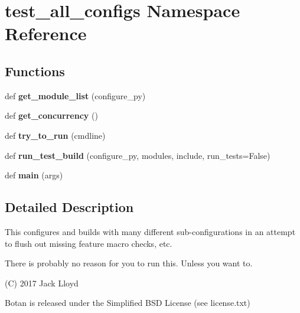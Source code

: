 \hypertarget{namespacetest__all__configs}{}\section{test\+\_\+all\+\_\+configs Namespace Reference}
\label{namespacetest__all__configs}
\subsection*{Functions}
\begin{DoxyCompactItemize}
\item 
\mbox{\label{namespacetest__all__configs_adf186082a5497497bf7870fa29511d61}} 
def {\bfseries get\+\_\+module\+\_\+list} (configure\+\_\+py)
\item 
\mbox{\label{namespacetest__all__configs_a820b2661dd95b2d159611db3129de91b}} 
def {\bfseries get\+\_\+concurrency} ()
\item 
\mbox{\label{namespacetest__all__configs_a41b734f98f45721f8a72a99e3dc6ea23}} 
def {\bfseries try\+\_\+to\+\_\+run} (cmdline)
\item 
\mbox{\label{namespacetest__all__configs_a64e1a68c48d377aee71399a4061ae38e}} 
def {\bfseries run\+\_\+test\+\_\+build} (configure\+\_\+py, modules, include, run\+\_\+tests=False)
\item 
\mbox{\label{namespacetest__all__configs_a7b10c21e5b6c55b22b0e17163b57d7e8}} 
def {\bfseries main} (args)
\end{DoxyCompactItemize}


\subsection{Detailed Description}
\begin{DoxyVerb}This configures and builds with many different sub-configurations
in an attempt to flush out missing feature macro checks, etc.

There is probably no reason for you to run this. Unless you want to.

(C) 2017 Jack Lloyd

Botan is released under the Simplified BSD License (see license.txt)
\end{DoxyVerb}
 